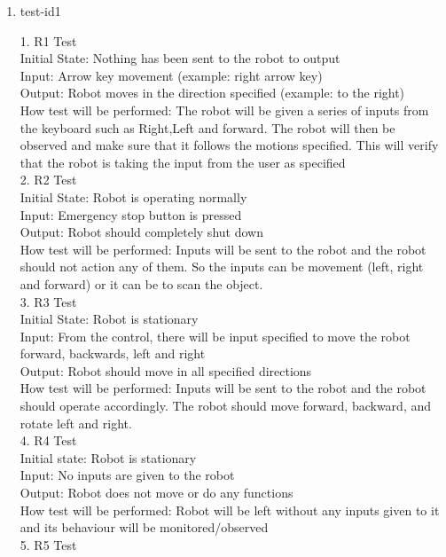 \documentclass[12pt, titlepage]{article}
\begin{document}
\begin{enumerate}

\item{test-id1\\}

1.	R1 Test \\
Initial State: Nothing has been sent to the robot to output \\
Input: Arrow key movement (example: right arrow key) \\ 
Output: Robot moves in the direction specified (example: to the right) \\ 
How test will be performed: The robot will be given a series of inputs from the keyboard such as Right,Left and forward. The robot will then be observed and make sure that it follows the motions specified. This will verify that the robot is taking the input from the user as specified \\
2.	R2 Test \\
Initial State: Robot is operating normally \\ 
Input: Emergency stop button is pressed \\ 
Output: Robot should completely shut down \\
How test will be performed: Inputs will be sent to the robot and the robot should not action any of them. So the inputs can be movement (left, right and forward) or it can be to scan the object.  \\
3.	R3 Test \\
Initial State: Robot is stationary \\
Input: From the control, there will be input specified to move the robot forward, backwards, left and right \\
Output: Robot should move in all specified directions \\
How test will be performed: Inputs will be sent to the robot and the robot should operate accordingly. The robot should move forward, backward, and rotate left and right. \\
4.	R4 Test \\
Initial state: Robot is stationary \\
Input: No inputs are given to the robot \\
Output: Robot does not move or do any functions \\
How test will be performed: Robot will be left without any inputs given to it and its behaviour will be monitored/observed \\
5.	R5 Test \\

\end{enumerate}
\end{document}
